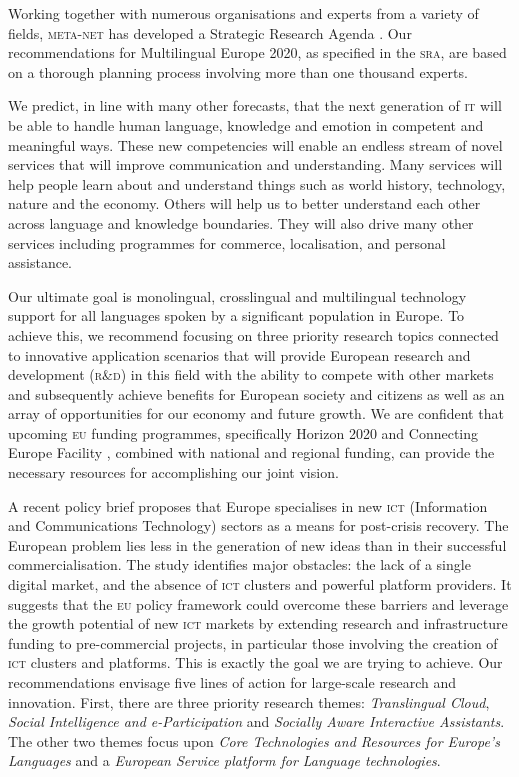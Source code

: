 \documentclass[output=paper]{LSP/langsci}
\begin{document}
Working together with numerous organisations and experts from a
variety of fields, \textsc{meta-net} has developed a Strategic Research Agenda
\citep[SRA,][]{SRA2013}. Our recommendations for Multilingual Europe
2020, as specified in the \textsc{sra}, are based on a thorough planning
process involving more than one thousand experts.

We predict, in line with many other forecasts, that the next
generation of \textsc{it} will be able to handle human language, knowledge and
emotion in competent and meaningful ways. These new competencies will
enable an endless stream of novel services that will improve
communication and understanding. Many services will help people learn
about and understand things such as world history, technology, nature
and the economy. Others will help us to better understand each other
across language and knowledge boundaries. They will also drive many
other services including programmes for commerce, localisation, and
personal assistance.

Our ultimate goal is monolingual, crosslingual and multilingual
technology support for all languages spoken by a significant
population in Europe. To achieve this, we recommend focusing on three
priority research topics connected to innovative application scenarios
that will provide European research and development (\textsc{r}\&\textsc{d}) in this field with the ability to
compete with other markets and subsequently achieve benefits for
European society and citizens as well as an array of opportunities for
our economy and future growth. We are confident that upcoming \textsc{eu}
funding programmes, specifically Horizon 2020 \citep{H2020} and
Connecting Europe Facility \citep{CEF2011}, combined with national and
regional funding, can provide the necessary resources for
accomplishing our joint vision.

A recent policy brief \citep{bruegel12} proposes that Europe
specialises in new \textsc{ict} (Information and Communications Technology)
sectors as a means for post-crisis recovery. The European problem lies
less in the generation of new ideas than in their successful
commercialisation. The study identifies major obstacles: the lack of a
single digital market, and the absence of \textsc{ict} clusters and powerful
platform providers. It suggests that the \textsc{eu} policy framework could
overcome these barriers and leverage the growth potential of new \textsc{ict}
markets by extending research and infrastructure funding to
pre-commercial projects, in particular those involving the creation of
\textsc{ict} clusters and platforms. This is exactly the goal we are trying to
achieve. Our recommendations envisage five lines of action for
large-scale research and innovation. First, there are three priority
research themes: \emph{Translingual Cloud}, \emph{Social Intelligence
  and e-Participation} and \emph{Socially Aware Interactive
  Assistants}. The other two themes focus upon \emph{Core Technologies
  and Resources for Europe's Languages} and a \emph{European Service
  platform for Language technologies}.
\end{document}
